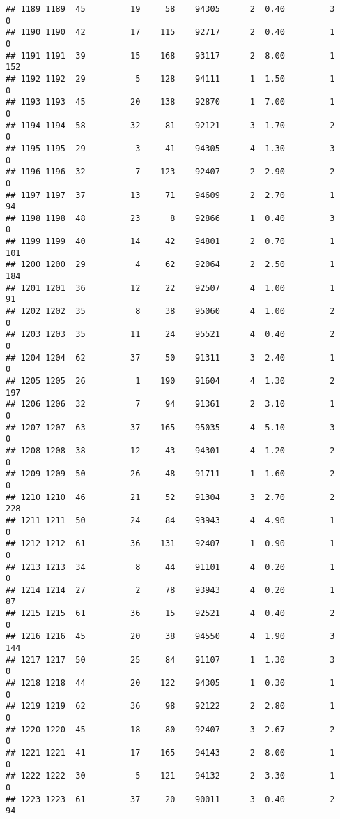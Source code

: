 \documentclass[
]{article}
\begin{document}
\begin{verbatim}
## 1189 1189  45         19     58    94305      2  0.40         3        0
## 1190 1190  42         17    115    92717      2  0.40         1        0
## 1191 1191  39         15    168    93117      2  8.00         1      152
## 1192 1192  29          5    128    94111      1  1.50         1        0
## 1193 1193  45         20    138    92870      1  7.00         1        0
## 1194 1194  58         32     81    92121      3  1.70         2        0
## 1195 1195  29          3     41    94305      4  1.30         3        0
## 1196 1196  32          7    123    92407      2  2.90         2        0
## 1197 1197  37         13     71    94609      2  2.70         1       94
## 1198 1198  48         23      8    92866      1  0.40         3        0
## 1199 1199  40         14     42    94801      2  0.70         1      101
## 1200 1200  29          4     62    92064      2  2.50         1      184
## 1201 1201  36         12     22    92507      4  1.00         1       91
## 1202 1202  35          8     38    95060      4  1.00         2        0
## 1203 1203  35         11     24    95521      4  0.40         2        0
## 1204 1204  62         37     50    91311      3  2.40         1        0
## 1205 1205  26          1    190    91604      4  1.30         2      197
## 1206 1206  32          7     94    91361      2  3.10         1        0
## 1207 1207  63         37    165    95035      4  5.10         3        0
## 1208 1208  38         12     43    94301      4  1.20         2        0
## 1209 1209  50         26     48    91711      1  1.60         2        0
## 1210 1210  46         21     52    91304      3  2.70         2      228
## 1211 1211  50         24     84    93943      4  4.90         1        0
## 1212 1212  61         36    131    92407      1  0.90         1        0
## 1213 1213  34          8     44    91101      4  0.20         1        0
## 1214 1214  27          2     78    93943      4  0.20         1       87
## 1215 1215  61         36     15    92521      4  0.40         2        0
## 1216 1216  45         20     38    94550      4  1.90         3      144
## 1217 1217  50         25     84    91107      1  1.30         3        0
## 1218 1218  44         20    122    94305      1  0.30         1        0
## 1219 1219  62         36     98    92122      2  2.80         1        0
## 1220 1220  45         18     80    92407      3  2.67         2        0
## 1221 1221  41         17    165    94143      2  8.00         1        0
## 1222 1222  30          5    121    94132      2  3.30         1        0
## 1223 1223  61         37     20    90011      3  0.40         2       94

\end{verbatim}
\end{document}
